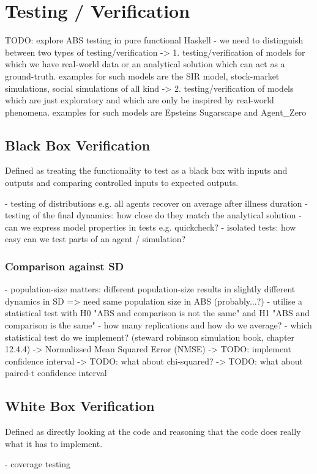 \section{Testing / Verification}
TODO: explore ABS testing in pure functional Haskell
- we need to distinguish between two types of testing/verification
	-> 1. testing/verification of models for which we have real-world data or an analytical solution which can act as a ground-truth. examples for such models are the SIR model, stock-market simulations, social simulations of all kind
	-> 2. testing/verification of models which are just exploratory and which are only be inspired by real-world phenomena. examples for such models are Epsteins Sugarscape and Agent\_Zero

\subsection{Black Box Verification}
Defined as treating the functionality to test as a black box with inputs and outputs and comparing controlled inputs to expected outputs.

- testing of distributions e.g. all agents recover on average after illness duration
- testing of the final dynamics: how close do they match the analytical solution
- can we express model properties in tests e.g. quickcheck?
- isolated tests: how easy can we test parts of an agent / simulation?

\subsubsection{Comparison against SD}
- population-size matters: different population-size results in slightly different dynamics in SD => need same population size in ABS (probably...?)
- utilise a statistical test with H0 "ABS and comparison is not the same" and H1 "ABS and comparison is the same"
- how many replications and how do we average?
- which statistical test do we implement? (steward robinson simulation book, chapter 12.4.4)
	-> Normalizsed Mean Squared Error (NMSE)
	-> TODO: implement confidence interval 
	-> TODO: what about chi-squared?
	-> TODO: what about paired-t confidence interval
	
\subsection{White Box Verification}
Defined as directly looking at the code and reasoning that the code does really what it has to implement.

- coverage testing